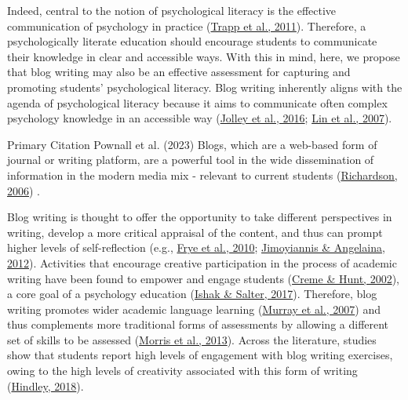 \documentclass[
  11pt,
  letterpaper,
  oneside,
  open=any]{scrbook}
\begin{document}
Indeed, central to the notion of psychological literacy is the effective
communication of psychology in practice
(\href{https://journals-sagepub-com.gold.idm.oclc.org/doi/full/10.1177/00986283211027278\#bibr64-00986283211027278}{Trapp
et al., 2011}). Therefore, a psychologically literate education should
encourage students to communicate their knowledge in clear and
accessible ways. With this in mind, here, we propose that blog writing
may also be an effective assessment for capturing and promoting
students' psychological literacy. Blog writing inherently aligns with
the agenda of psychological literacy because it aims to communicate
often complex psychology knowledge in an accessible way
(\href{https://journals-sagepub-com.gold.idm.oclc.org/doi/full/10.1177/00986283211027278\#bibr38-00986283211027278}{Jolley
et al., 2016};
\href{https://journals-sagepub-com.gold.idm.oclc.org/doi/full/10.1177/00986283211027278\#bibr43-00986283211027278}{Lin
et al., 2007}).

Primary Citation Pownall et al. (2023) Blogs, which are a web-based form
of journal or writing platform, are a powerful tool in the wide
dissemination of information in the modern media mix - relevant to
current students
(\href{https://journals-sagepub-com.gold.idm.oclc.org/doi/full/10.1177/00986283211027278\#bibr56-00986283211027278}{Richardson,
2006}) .

Blog writing is thought to offer the opportunity to take different
perspectives in writing, develop a more critical appraisal of the
content, and thus can prompt higher levels of self-reflection (e.g.,
\href{https://journals-sagepub-com.gold.idm.oclc.org/doi/full/10.1177/00986283211027278\#bibr22-00986283211027278}{Frye
et al., 2010};
\href{https://journals-sagepub-com.gold.idm.oclc.org/doi/full/10.1177/00986283211027278\#bibr37-00986283211027278}{Jimoyiannis
\& Angelaina, 2012}). Activities that encourage creative participation
in the process of academic writing have been found to empower and engage
students
(\href{https://journals-sagepub-com.gold.idm.oclc.org/doi/full/10.1177/00986283211027278\#bibr18-00986283211027278}{Creme
\& Hunt, 2002}), a core goal of a psychology education
(\href{https://journals-sagepub-com.gold.idm.oclc.org/doi/full/10.1177/00986283211027278\#bibr36-00986283211027278}{Ishak
\& Salter, 2017}). Therefore, blog writing promotes wider academic
language learning
(\href{https://journals-sagepub-com.gold.idm.oclc.org/doi/full/10.1177/00986283211027278\#bibr49-00986283211027278}{Murray
et al., 2007}) and thus complements more traditional forms of
assessments by allowing a different set of skills to be assessed
(\href{https://journals-sagepub-com.gold.idm.oclc.org/doi/full/10.1177/00986283211027278\#bibr47-00986283211027278}{Morris
et al., 2013}). Across the literature, studies show that students report
high levels of engagement with blog writing exercises, owing to the high
levels of creativity associated with this form of writing
(\href{https://journals-sagepub-com.gold.idm.oclc.org/doi/full/10.1177/00986283211027278\#bibr31-00986283211027278}{Hindley,
2018}).
\end{document}
